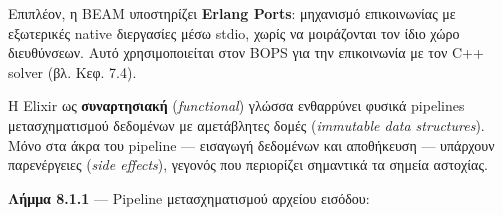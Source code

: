Επιπλέον, η BEAM υποστηρίζει \textbf{Erlang Ports}: μηχανισμό
επικοινωνίας με εξωτερικές native διεργασίες μέσω stdio, χωρίς να
μοιράζονται τον ίδιο χώρο διευθύνσεων. Αυτό χρησιμοποιείται στον BOPS
για την επικοινωνία με τον C++ solver (βλ. Κεφ. 7.4).

Η Elixir ως \textbf{συναρτησιακή} (\emph{functional}) γλώσσα ενθαρρύνει
φυσικά pipelines μετασχηματισμού δεδομένων με αμετάβλητες δομές
(\emph{immutable data structures}). Μόνο στα άκρα του pipeline ---
εισαγωγή δεδομένων και αποθήκευση --- υπάρχουν παρενέργειες (\emph{side
effects}), γεγονός που περιορίζει σημαντικά τα σημεία αστοχίας.

\textbf{Λήμμα 8.1.1} --- Pipeline μετασχηματισμού αρχείου εισόδου:

\begin{Shaded}
\begin{Highlighting}[]
\FunctionTok{(}\NormalTok{\%}\FunctionTok{\{}\FunctionTok{\}}\NormalTok{, } \FunctionTok{)} 
 \FunctionTok{(}\FunctionTok{)} \OperatorTok{\textless{}{-}}\OtherTok{[}\OtherTok{]}\NormalTok{,}
\OperatorTok{ !=}  \OperatorTok{\textless{}{-}}
\FunctionTok{(}\OtherTok{[}\OtherTok{]}\FunctionTok{)} 
    \FunctionTok{\{}\NormalTok{,}
\NormalTok{     \%}\FunctionTok{\{}
       \OtherTok{[}\OtherTok{]}\NormalTok{,}
       \OperatorTok{|\textgreater{}} \FunctionTok{()}\NormalTok{,}
       \FunctionTok{(}\OtherTok{[}\OtherTok{]}\FunctionTok{)}\NormalTok{,}
     \FunctionTok{\}\}}
     \OperatorTok{{-}\textgreater{}}
      \FunctionTok{\{}\NormalTok{, }\FunctionTok{\}}

     \OperatorTok{{-}\textgreater{}}
      \FunctionTok{\{}\NormalTok{, }\FunctionTok{\}}
\end{Highlighting}
\end{Shaded}

